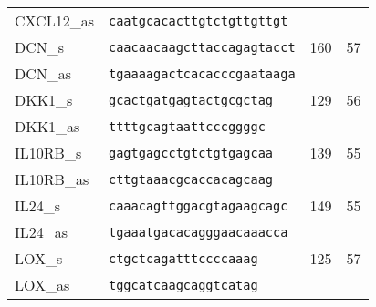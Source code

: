 \begin{spacing}{1}
{\begin{longtable}{|l|l|p{2cm}|p{2cm}|}
            \hhline{--~~}
            CXCL12\_as   & \texttt{caatgcacacttgtctgttgttgt}                                                                                         &     &                            \\
            \hhline{====}
            DCN\_s       & \texttt{caacaacaagcttaccagagtacct}                                                                                        & 160 & 57                         \\
            \hhline{--~~}
            DCN\_as      & \texttt{tgaaaagactcacacccgaataaga}                                                                                        &     &                            \\
            \hhline{====}
            DKK1\_s      & \texttt{gcactgatgagtactgcgctag}                                                                                           & 129 & 56                         \\
            \hhline{--~~}
            DKK1\_as     & \texttt{ttttgcagtaattcccggggc}                                                                                            &     &                            \\
            \hhline{====}
            IL10RB\_s    & \texttt{gagtgagcctgtctgtgagcaa}                                                                                           & 139 & 55                         \\
            \hhline{--~~}
            IL10RB\_as   & \texttt{cttgtaaacgcaccacagcaag}                                                                                           &     &                            \\
            \hhline{====}
            IL24\_s      & \texttt{caaacagttggacgtagaagcagc}                                                                                         & 149 & 55                         \\
            \hhline{--~~}
            IL24\_as     & \texttt{tgaaatgacacagggaacaaacca}                                                                                         &     &                            \\
            \hhline{====}
            LOX\_s       & \texttt{ctgctcagatttccccaaag}                                                                                             & 125 & 57                         \\
            \hhline{--~~}
            LOX\_as      & \texttt{tggcatcaagcaggtcatag}                                                                                             &     &                            \\

\end{longtable}}
\end{spacing}
